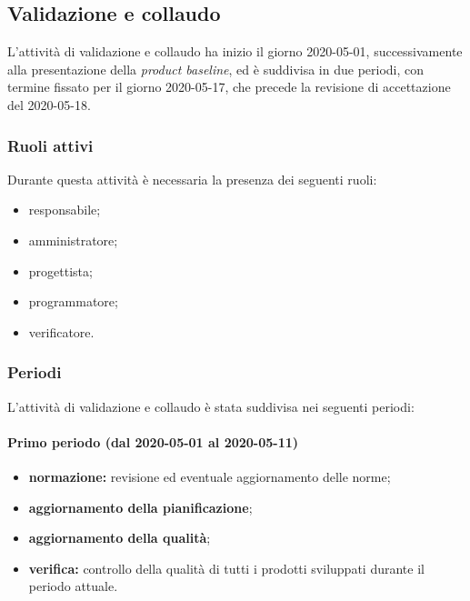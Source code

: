 
		\subsection{Validazione e collaudo}	
		
			L'attività di validazione e collaudo ha inizio il giorno 2020-05-01, successivamente alla presentazione della \textit{product baseline}, ed è suddivisa in due periodi, con termine fissato per il giorno 2020-05-17, che precede la revisione di accettazione del 2020-05-18.
			
			\subsubsection{Ruoli attivi}
			
			Durante questa attività è necessaria la presenza dei seguenti ruoli:
			\begin{itemize}
				\item responsabile;
				\item amministratore;
				\item progettista;
				\item programmatore;
				\item verificatore.
			\end{itemize}
			
			\subsubsection{Periodi}
			
				L'attività di validazione e collaudo è stata suddivisa nei seguenti periodi:
		
				\paragraph{Primo periodo (dal 2020-05-01 al 2020-05-11)}
			
					\begin{itemize}
						\item \textbf{normazione:} revisione ed eventuale aggiornamento delle norme;
						\item \textbf{aggiornamento della pianificazione};
						\item \textbf{aggiornamento della qualità};
						\item \textbf{verifica:} controllo della qualità di tutti i prodotti sviluppati durante il periodo attuale.
					\end{itemize} 	
				
